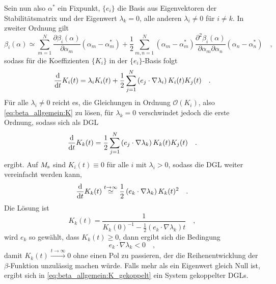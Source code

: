     Sein nun also $\alpha^*$ ein Fixpunkt, $\{e_i\}$ die Basis aus Eigenvektoren der 
    Stabilitätsmatrix und der Eigenwert $\lambda_k=0$, alle anderen $\lambda_i \neq 0$ 
    für $i\neq k$. In zweiter Ordnung gilt
    \begin{equation}
     \beta_i(\alpha) \simeq \sum\limits_{m=1}^N \frac{\partial \beta_i(\alpha)}{\partial
     \alpha_m} \left(\alpha_m-\alpha^*_m\right) + \frac12 \sum\limits_{m,n=1}^N 
      \left(\alpha_m-\alpha^*_m\right)
     \frac{\partial^2 \beta_i(\alpha)}{\partial\alpha_m \partial\alpha_n}
     \left(\alpha_n-\alpha^*_n\right) \quad ,
    \end{equation}
    sodass für die Koeffizienten $\{K_i\}$ in der $\{e_i\}$-Basis folgt
    \begin{equation}
     \frac{\text{d}}{\text{d} t} K_i(t) = \lambda_i K_i(t) + \frac12
     \sum\limits_{j=1}^N \left( e_j\cdot \nabla \lambda_i \right) K_i(t)K_j(t) \quad .
    \end{equation}
    Für alle $\lambda_i \neq 0 $ reicht es, die Gleichungen in Ordnung $\mathcal{O}(K_i)$, 
    also \eqref{eq:beta_allgemein:K} zu lösen, für $\lambda_k=0$ verschwindet jedoch die 
    erste Ordnung, sodass sich als DGL
    \begin{equation}
     \frac{\text{d}}{\text{d} t} K_k(t) = \frac12 \sum\limits_{j=1}^N \left( e_j\cdot \nabla \lambda_k 
     \right) K_k(t)K_j(t) \quad . \label{eq:beta_allgemein:K_gekoppelt}
    \end{equation}
    ergibt. Auf $M_\text{s}$ sind $K_i(t)\equiv 0$ für alle $i$ mit $\lambda_i > 0$, sodass die 
    DGL weiter vereinfacht werden kann, 
    \begin{equation}
     \frac{\text{d}}{\text{d} t} K_k(t) \overset{t\to\infty}{\simeq} \frac12 \left( e_k \cdot 
     \nabla\lambda_k \right) K_k(t)^2 \quad .
    \end{equation}
    Die Lösung ist
    \begin{equation}
     K_k(t) = \frac{1}{K_k(0)^{-1} - \frac12 \left( e_k\cdot \nabla \lambda_k \right) t } \quad ,
    \end{equation}
    wird $e_k$ so gewählt, dass $K_k(t)\geq 0$, dann ergibt sich die Bedingung
    \begin{equation}
     e_k \cdot \nabla\lambda_k < 0 \quad , \label{eq:beta_allgemein:lambda0_bedingung} 
    \end{equation}
    damit $K_k(t)\overset{t\to\infty}{\longrightarrow}0$ ohne einen Pol zu passieren, der die 
    Reihenentwicklung der $\beta$-Funktion unzulässig machen würde. Falls mehr als ein 
    Eigenwert gleich Null ist, ergibt sich in \eqref{eq:beta_allgemein:K_gekoppelt} ein 
    System gekoppelter DGLs.

